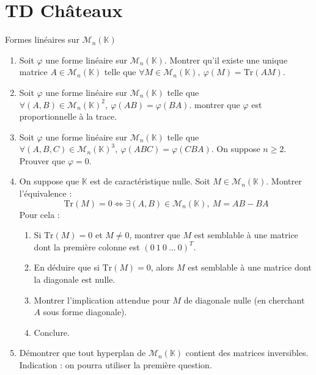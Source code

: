 \documentclass[french,a4paper]{article}
\newcommand{\K}{\mathbb{K}}
\newcommand{\Tr}{\text{Tr}}
\theoremstyle{plain}
\theoremstyle{definition}
\theoremstyle{remark}
\begin{document}
\section{TD Châteaux}
\begin{ex}{Formes linéaires sur $\mathcal{M}_n(\K)$}
	\begin{enumerate}
		\item Soit $\varphi$ une forme linéaire sur $\mathcal{M}_n(\K)$. Montrer qu'il existe une unique matrice $A\in\mathcal{M}_n(\K)$ telle que $\forall M\in\mathcal{M}_n(\K),\ \varphi(M)=\Tr(AM)$.
		\item Soit $\varphi$ une forme linéaire sur $\mathcal{M}_n(\K)$ telle que $\forall (A,B)\in\mathcal{M}_n(\K)^2,\ \varphi(AB)=\varphi(BA)$. montrer que $\varphi$ est proportionnelle à la trace.
		\item Soit $\varphi$ une forme linéaire sur $\mathcal{M}_n(\K)$ telle que $\forall(A,B,C)\in\mathcal{M}_n(\K)^3,\ \varphi(ABC)=\varphi(CBA)$. On suppose $n\geqslant 2$. Prouver que $\varphi=0$.
		\item On suppose que $\K$ est de caractéristique nulle. Soit $M\in\mathcal{M}_n(\K)$. Montrer l'équivalence : $$\Tr(M)=0\iff\exists(A,B)\in\mathcal{M}_n(\K),\ M=AB-BA$$ Pour cela : 
		\begin{enumerate}[label=\alph*.]
			\item Si $\Tr(M)=0$ et $M\ne 0$, montrer que $M$ est semblable à une matrice dont la première colonne est $(0\ 1\ 0\ \ldots\ 0)^T$.
			\item En déduire que si $\Tr(M)=0$, alors $M$ est semblable à une matrice dont la diagonale est nulle.
			\item Montrer l'implication attendue pour $M$ de diagonale nulle (en cherchant $A$ sous forme diagonale).
			\item Conclure.
		\end{enumerate}
		\item Démontrer que tout hyperplan de $\mathcal{M}_n(\K)$ contient des matrices inversibles. Indication : on pourra utiliser la première question.
	\end{enumerate}
\end{ex}
\end{document}
